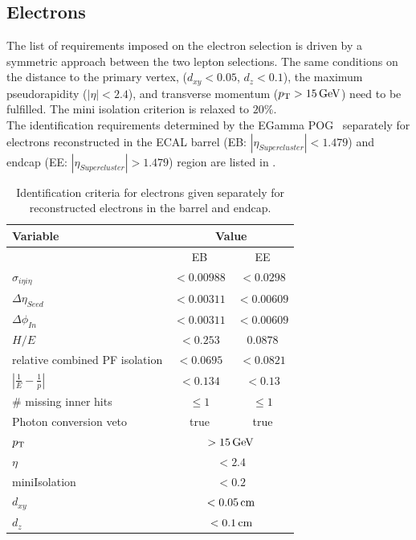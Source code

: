 \subsection{Electrons}
The list of requirements imposed on the electron selection is driven by a symmetric approach between the two lepton selections. The same conditions on the distance to the primary vertex, ($d_{xy}<0.05$, $d_z<0.1$), the maximum pseudorapidity ($|\eta|<2.4$), and transverse momentum ($p_{\mathrm{T}}>15\,\text{Ge\hspace{-.08em}V}$) need to be fulfilled. The mini isolation criterion is relaxed to $20\%$.\\
The identification requirements determined by the EGamma POG~\cite{ElectronID} separately for electrons reconstructed in the ECAL barrel (EB: $|\eta_{Supercluster}|<1.479$) and endcap (EE: $|\eta_{Supercluster}|>1.479$) region are listed in .
\begin{table}[tbp]
 \centering
 \caption{Identification criteria for electrons given separately for reconstructed electrons in the barrel and endcap.}
 \label{tab:eleID}
 \begin{tabular}{lcc}
  Variable                       & \multicolumn{2}{c}{Value}                   \\\hline
                                 & EB                             & EE         \\\hline
  $\sigma_{i\eta i\eta}$         & $<0.00988$                     & $<0.0298$  \\
  $\Delta\eta_{Seed}$            & $<0.00311$                     & $<0.00609$ \\
  $\Delta\phi_{In}$              & $<0.00311$                     & $<0.00609$ \\
  $H/E$                          & $<0.253$                       & $0.0878$   \\
  relative combined PF isolation & $<0.0695$                      & $<0.0821$  \\
  $|\frac{1}{E}-\frac{1}{p}|$    & $<0.134$                       & $<0.13$    \\
  \# missing inner hits          & $\leq1$                        & $\leq1$    \\
  Photon conversion veto         & true                           & true       \\\hline
  $p_{\mathrm{T}}$                          & \multicolumn{2}{c}{$>15\,\text{Ge\hspace{-.08em}V}$}               \\
  $\eta$                         & \multicolumn{2}{c}{$<2.4$}                  \\
  miniIsolation                  & \multicolumn{2}{c}{$<0.2$}                  \\
  $d_{xy}$                       & \multicolumn{2}{c}{$<0.05\,\text{cm}$}              \\
  $d_z$                          & \multicolumn{2}{c}{$<0.1\,\text{cm}$}               \\\hline
 \end{tabular}
\end{table}

